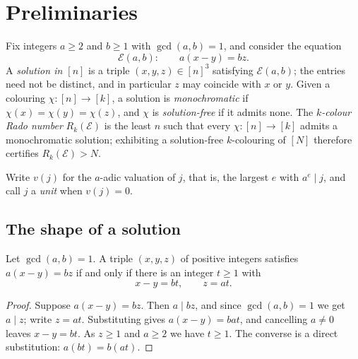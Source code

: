 %

\section{Preliminaries}

Fix integers $a \ge 2$ and $b \ge 1$ with $\gcd(a,b) = 1$, and consider the
equation
\[
  \mathcal{E}(a,b): \qquad a(x - y) = b z .
\]
A \emph{solution in $[n]$} is a triple $(x,y,z) \in [n]^3$ satisfying
$\mathcal{E}(a,b)$; the entries need not be distinct, and in particular $z$
may coincide with $x$ or $y$. Given a colouring $\chi : [n] \to [k]$, a
solution is \emph{monochromatic} if $\chi(x) = \chi(y) = \chi(z)$, and $\chi$
is \emph{solution-free} if it admits none. The \emph{$k$-colour Rado number}
$R_k(\mathcal{E})$ is the least $n$ such that every $\chi : [n] \to [k]$
admits a monochromatic solution; exhibiting a solution-free $k$-colouring of
$[N]$ therefore certifies $R_k(\mathcal{E}) > N$.

Write $v(j)$ for the $a$-adic valuation of $j$, that is, the largest $e$ with
$a^e \mid j$, and call $j$ a \emph{unit} when $v(j) = 0$.

\subsection{The shape of a solution}

\begin{lemma}\label{lem:solform}
Let $\gcd(a,b) = 1$. A triple $(x,y,z)$ of positive integers satisfies
$a(x-y) = bz$ if and only if there is an integer $t \ge 1$ with
\[
  x - y = b t, \qquad z = a t .
\]
\end{lemma}

\begin{proof}
Suppose $a(x-y) = bz$. Then $a \mid bz$, and since $\gcd(a,b) = 1$ we get
$a \mid z$; write $z = at$. Substituting gives $a(x-y) = bat$, and cancelling
$a \neq 0$ leaves $x - y = bt$. As $z \ge 1$ and $a \ge 2$ we have $t \ge 1$.
The converse is a direct substitution:
$a(bt) = b(at)$.
\end{proof}

